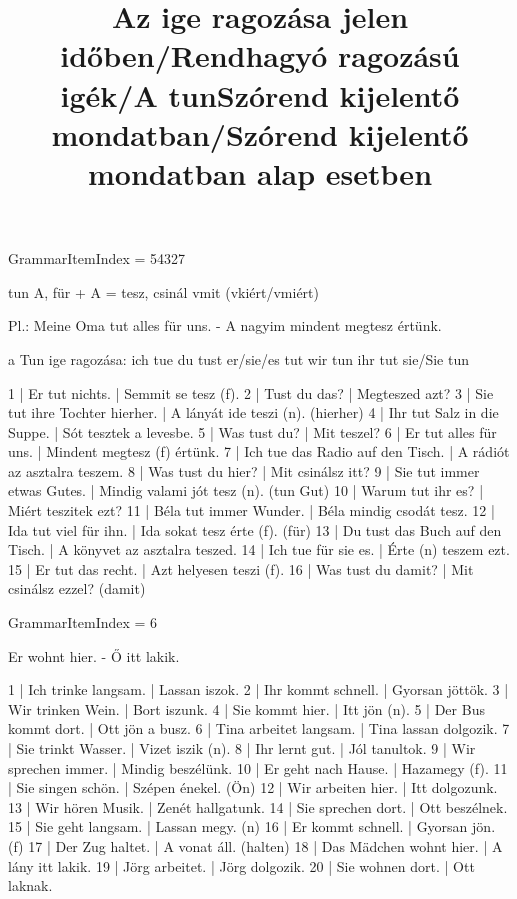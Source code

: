 \title{Az ige ragozása jelen időben/Rendhagyó ragozású igék/A tun}

GrammarItemIndex = 54327

\begin{desc}
tun A, für + A = tesz, csinál vmit (vkiért/vmiért)

Pl.: Meine Oma tut alles für uns. - A nagyim mindent megtesz értünk.

a Tun ige ragozása:
ich tue
du tust
er/sie/es tut
wir tun
ihr tut
sie/Sie tun
\end{desc}

\begin{exmp}
1 | Er tut nichts. | Semmit se tesz (f).
2 | Tust du das? | Megteszed azt?
3 | Sie tut ihre Tochter hierher. | A lányát ide teszi (n). (hierher)
4 | Ihr tut Salz in die Suppe. | Sót tesztek a levesbe.
5 | Was tust du? | Mit teszel?
6 | Er tut alles für uns. | Mindent megtesz (f) értünk.
7 | Ich tue das Radio auf den Tisch. | A rádiót az asztalra teszem.
8 | Was tust du hier? | Mit csinálsz itt?
9 | Sie tut immer etwas Gutes. | Mindig valami jót tesz (n). (tun Gut)
10 | Warum tut ihr es? | Miért teszitek ezt?
11 | Béla tut immer Wunder. | Béla mindig csodát tesz.
12 | Ida tut viel für ihn. | Ida sokat tesz érte (f). (für)
13 | Du tust das Buch auf den Tisch. | A könyvet az asztalra teszed.
14 | Ich tue für sie es. | Érte (n) teszem ezt.
15 | Er tut das recht. | Azt helyesen teszi (f).
16 | Was tust du damit? | Mit csinálsz ezzel? (damit)
\end{exmp}

\title{Szórend kijelentő mondatban/Szórend kijelentő mondatban alap esetben}

GrammarItemIndex = 6

\begin{desc}
Er wohnt hier. - Ő itt lakik.
\end{desc}

\begin{exmp}
1 | Ich trinke langsam. | Lassan iszok.
2 | Ihr kommt schnell. | Gyorsan jöttök.
3 | Wir trinken Wein. | Bort iszunk.
4 | Sie kommt hier. | Itt jön (n).
5 | Der Bus kommt dort. | Ott jön a busz.
6 | Tina arbeitet langsam. | Tina lassan dolgozik.
7 | Sie trinkt Wasser. | Vizet iszik (n).
8 | Ihr lernt gut. | Jól tanultok.
9 | Wir sprechen immer. | Mindig beszélünk.
10 | Er geht nach Hause. | Hazamegy (f).
11 | Sie singen schön. | Szépen énekel. (Ön)
12 | Wir arbeiten hier. | Itt dolgozunk.
13 | Wir hören Musik. | Zenét hallgatunk.
14 | Sie sprechen dort. | Ott beszélnek.
15 | Sie geht langsam. | Lassan megy. (n)
16 | Er kommt schnell. | Gyorsan jön. (f)
17 | Der Zug haltet. | A vonat áll. (halten)
18 | Das Mädchen wohnt hier. | A lány itt lakik.
19 | Jörg arbeitet. | Jörg dolgozik.
20 | Sie wohnen dort. | Ott laknak.
\end{exmp}

